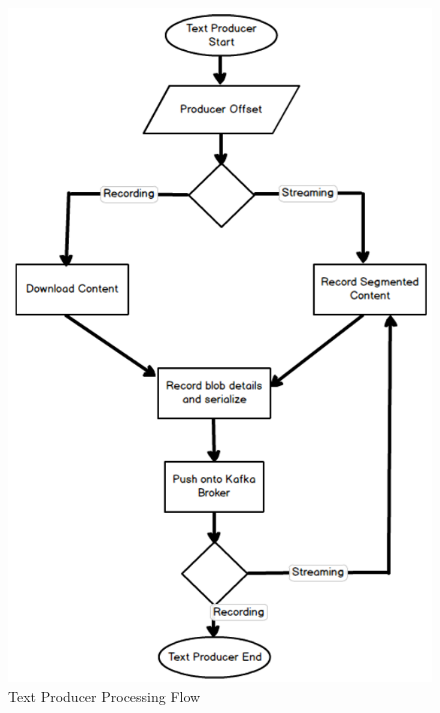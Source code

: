 \documentclass[10pt,conference]{IEEEtran}
\begin{document}
\begin{figure}
  \includegraphics[width=\linewidth]{ProducerTextFlow.png}
  \caption                          {Text Producer Processing Flow}
  \label                            {fig:ProducerTextFlow}
\end{figure}
\end{document}
